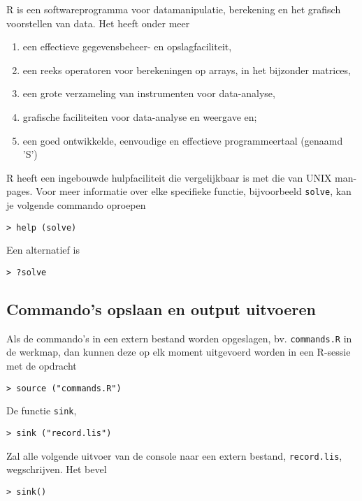 R is een softwareprogramma voor datamanipulatie, berekening en het grafisch voorstellen van data. Het heeft onder meer

\begin{enumerate}
  \item een effectieve gegevensbeheer- en opslagfaciliteit,
  \item een reeks operatoren voor berekeningen op arrays, in het bijzonder matrices,
  \item een grote verzameling van instrumenten voor data-analyse,
  \item grafische faciliteiten voor data-analyse en weergave en;
  \item een goed ontwikkelde, eenvoudige en effectieve programmeertaal (genaamd 'S')
\end{enumerate}

R heeft een ingebouwde hulpfaciliteit die vergelijkbaar is met die van UNIX man-pages. Voor meer informatie over elke specifieke functie, bijvoorbeeld \texttt{solve}, kan je volgende commando oproepen

\begin{lstlisting}
> help (solve)
\end{lstlisting}

Een alternatief is
\begin{lstlisting}
> ?solve
\end{lstlisting}

\subsection{Commando's opslaan en output uitvoeren}

Als de commando's in een extern bestand worden opgeslagen, bv. \texttt{commands.R} in de werkmap, dan kunnen deze op elk moment uitgevoerd worden in een R-sessie met de opdracht

\begin{lstlisting}
> source ("commands.R")
\end{lstlisting}

De functie \texttt{sink},

\begin{lstlisting}
> sink ("record.lis")
\end{lstlisting}

Zal alle volgende uitvoer van de console naar een extern bestand, \texttt{record.lis}, wegschrijven. Het bevel

\begin{lstlisting}
> sink()
\end{lstlisting}

